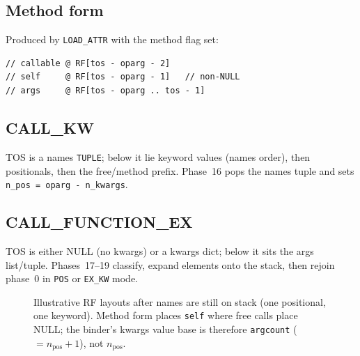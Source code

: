 \documentclass[11pt,a4paper]{article}
\begin{document}
\subsection{Method form}
Produced by \texttt{LOAD\_ATTR} with the method flag set:
\begin{lstlisting}[style=sv]
// callable @ RF[tos - oparg - 2]
// self     @ RF[tos - oparg - 1]   // non-NULL
// args     @ RF[tos - oparg .. tos - 1]
\end{lstlisting}

\subsection{CALL\_KW}
TOS is a names \texttt{TUPLE}; below it lie keyword values (names order), then
positionals, then the free/method prefix.
Phase~16 pops the names tuple and sets
\texttt{n\_pos = oparg - n\_kwargs}.

\subsection{CALL\_FUNCTION\_EX}
TOS is either NULL (no kwargs) or a kwargs dict; below it sits the args
list/tuple.
Phases~17--19 classify, expand elements onto the stack, then rejoin phase~0 in
\texttt{POS} or \texttt{EX\_KW} mode.

\begin{figure}[ht]
\centering
{}
\caption{Illustrative RF layouts after names are still on stack
(one positional, one keyword).
Method form places \texttt{self} where free calls place NULL; the binder's
kwargs value base is therefore \texttt{argcount} ($= n_{\mathrm{pos}}+1$), not
$n_{\mathrm{pos}}$.}
\label{fig:stack}
\end{figure}
\end{document}
